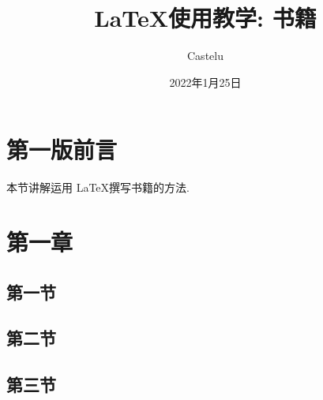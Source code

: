 \documentclass[11pt, twoside, UTF8]{book}
\title{\LaTeX 使用教学: 书籍}
\author{Castelu}
\date{2022年1月25日}
\theoremstyle{plain}
\theoremstyle{definition}
\theoremstyle{remark}
\begin{document}
	\frontmatter
	\maketitle
	
	\chapter*{第一版前言}
	
	本节讲解运用 \LaTeX 撰写书籍的方法.
	
	\begin{flushright}
	\end{flushright}
	\tableofcontents
	\mainmatter
	
	\chapter{第一章}
	
	\section{第一节}
	
	\section{第二节}
	
	\section{第三节}
	
\end{document}
